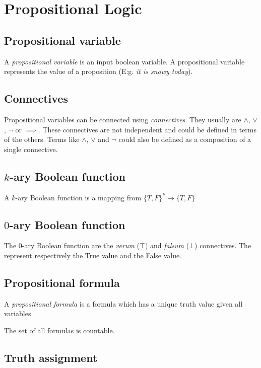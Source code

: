 \documentclass[a4paper]{article}
\begin{document}
\pagebreak

\section{Propositional Logic}

\subsection{Propositional variable}

A \textit{propositional variable} is an input boolean variable.
A propositional variable represents the value of a proposition (E:g. \textit{it is snowy today}).

\subsection{Connectives}

Propositional variables can be connected using \textit{connectives}.
They usually are \(\land\), \(\lor\), \(\lnot\) or \(\implies\).
These connectives are not independent and could be defined in terms of the others.
Terms like  \(\land\), \(\lor\) and \(\lnot\) could also be defined as a composition of a single connective.

\subsection{\(k\)-ary Boolean function}

A \(k\)-ary Boolean function is a mapping from \({\{T, F\}}^k \to \{T,F\}\)

\subsection{\(0\)-ary Boolean function}

The \(0\)-ary Boolean function are the \textit{verum} (\(\top\)) and \textit{falsum} (\(\bot\)) connectives.
The represent respectively the True value and the False value.

\subsection{Propositional formula}

A \textit{propositional formula} is a formula which has a unique truth value given all variables.

The set of all formulas is countable.

\subsection{Truth assignment}
\end{document}
